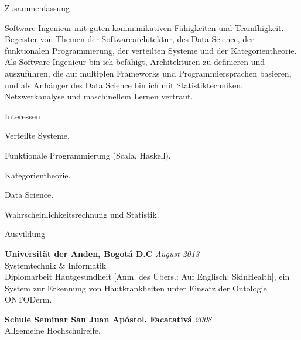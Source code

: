\documentclass[spanish]{resume} %
\begin{document}

\begin{rSection}{Zusammenfassung}

Software-Ingenieur mit guten kommunikativen F{\"a}higkeiten und Teamfhigkeit. Begeister von Themen der Softwarearchitektur, des Data Science, der funktionalen Programmierung, der verteilten Systeme und der Kategorientheorie. Als Software-Ingenieur bin ich bef{\"a}higt, Architekturen zu definieren und auszuf{\"u}hren, die auf multiplen Frameworks und Programmiersprachen basieren, und als Anh{\"a}nger des Data Science bin ich mit Statistiktechniken, Netzwerkanalyse und maschinellem Lernen vertraut.

\end{rSection}

\begin{rSection}{Interessen}

\item Verteilte Systeme.
\item Funktionale Programmierung (Scala, Haskell).
\item Kategorientheorie.
\item Data Science.
\item Wahrscheinlichkeitsrechnung und Statistik.

\end{rSection}


\begin{rSection}{Ausvildung}

{\bf Universit{\"a}t der Anden, Bogot\'a D.C} \hfill {\em August 2013} \\
Systemtechnik \& Informatik \\
Diplomarbeit Hautgesundheit [Anm. des {\"U}bers.: Auf Englisch: SkinHealth], ein System zur Erkennung von Hautkrankheiten unter Einsatz der Ontologie ONTODerm.

{\bf Schule Seminar San Juan Ap\'ostol, Facatativ\'a} \hfill {\em 2008} \\
Allgemeine Hochschulreife.

\end{rSection}
\end{document}
